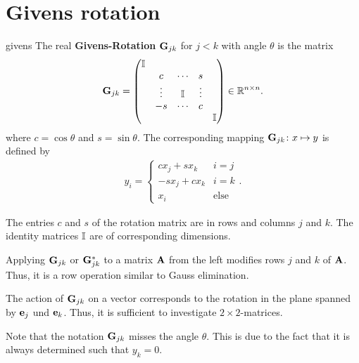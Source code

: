 \section{Givens rotation}

\begin{Definition}{givens}
  The real \textbf{Givens-Rotation}
  $\mathbf G_{jk}$ for $j<k$ with angle $\theta$ is the matrix
  \begin{gather}
      \mathbf G_{jk} =
    \begin{pmatrix}
      \mathbb I \\
      &c&\cdots&s\\
      &\vdots&\mathbb I &\vdots\\
      &-s&\cdots&c\\
      &&&&\mathbb I
    \end{pmatrix}
    \in\mathbb R^{n\times n}.
  \end{gather}
    where $c = \cos\theta$ and $s = \sin\theta$.
  The corresponding mapping $\mathbf G_{jk}\colon x\mapsto y$ is defined by
  \begin{gather}
    y_i =
    \begin{cases}
      c x_j + s x_k & i=j\\
      -s x_j + c x_k & i=k\\
      x_i &\text{else}
    \end{cases}.
  \end{gather}
\end{Definition}

\begin{remark}
  The entries $c$ and $s$ of the rotation matrix are in rows and
  columns $j$ and $k$.  The identity matrices $\mathbb I$ are of
  corresponding dimensions.

  Applying $\mathbf G_{jk}$ or $\mathbf G_{jk}^*$ to a matrix $\mathbf A$ from
  the left modifies rows $j$ and $k$ of $\mathbf A$. Thus, it is a row
  operation similar to Gauss elimination.

  The action of $\mathbf G_{jk}$ on a vector corresponds to the rotation
  in the plane spanned by $\mathbf e_j$ und $\mathbf e_k$. Thus, it is sufficient
  to investigate $2\times2$-matrices.

  Note that the notation $\mathbf G_{jk}$ misses the angle $\theta$. This
  is due to the fact that it is always determined such that $y_k=0$.
\end{remark}

